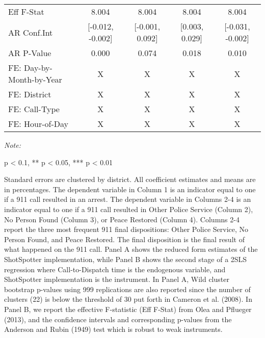 \begin{table}[H]
\begin{threeparttable}
\begin{tabular}[t]{lcccc}
\hspace{1em}Eff F-Stat & 8.004 & 8.004 & 8.004 & 8.004\\
\hspace{1em}AR Conf.Int & {}[-0.012, -0.002] & {}[-0.001, 0.092] & {}[0.003, 0.029] & {}[-0.031, -0.002]\\
\hspace{1em}AR P-Value & 0.000 & 0.074 & 0.018 & 0.010\\
FE: Day-by-Month-by-Year & X & X & X & X\\
FE: District & X & X & X & X\\
FE: Call-Type & X & X & X & X\\
FE: Hour-of-Day & X & X & X & X\\
\bottomrule
\end{tabular}
\begin{tablenotes}
\item \textit{Note: } 
\item * p < 0.1, ** p < 0.05, *** p < 0.01
\item Standard errors are clustered by district. All                      coefficient estimates and means are in percentages.                        The dependent variable in Column 1 is an indicator equal to one if a 911 call resulted in an arrest.                      The dependent variable in Columns 2-4 is an indicator equal to one if a 911 call resulted in                       Other Police Service (Column 2), No Person Found (Column 3), or Peace Restored (Column 4).                  Columns 2-4 report the three most frequent 911 final dispositions: Other Police Service, No Person Found,                   and Peace Restored. The final disposition is the final result of                  what happened on the 911 call.                   Panel A shows the reduced form estimates of the ShotSpotter implementation, while                       Panel B shows the second stage of a 2SLS regression where Call-to-Dispatch time is the                      endogenous variable, and ShotSpotter implementation is the instrument.                                    In Panel A, Wild cluster bootstrap p-values using 999 replications are also reported                  since the number of clusters (22) is below the threshold of 30 put forth in                  Cameron et al. (2008).                  In Panel B, we report the effective F-statistic (Eff F-Stat) from Olea and Pflueger (2013), and the confidence intervals and corresponding                  p-values from the Anderson and Rubin (1949) test which is robust to weak instruments.                  
\end{tablenotes}
\end{threeparttable}
\end{table}
